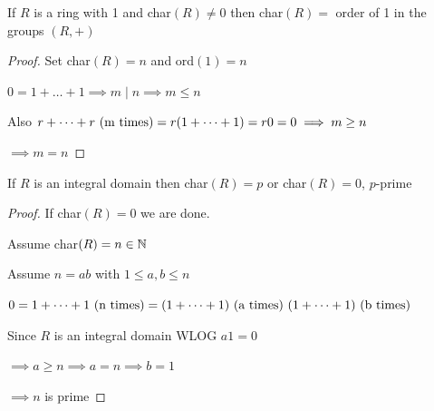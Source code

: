 \begin{proposition}
    If $R$ is a ring with 1  and char$(R)\neq 0$ then char$(R)=$ order of 1 in the groups
    $(R,+)$
\end{proposition}

\begin{proof}
    Set char$(R)=n$ and ord$(1)=n$

    $0=1+\dots+1 \implies m \mid n \implies m \leq n$

    Also $r+\dots+r\text{ (m times)}=r(1+\dots+1)=r0=0 \implies m \geq n$

    $\implies m=n$
\end{proof}

\begin{proposition}
    If $R$ is an integral domain then char$(R)=p$ or char$(R)=0$, $p$-prime
\end{proposition}

\begin{proof}
    If char$(R)=0$ we are done.

    Assume char$(R)=n \in \mathbb{N}$

    Assume $n=ab$ with $1\leq a,b\leq n$

    $0=1+\dots+1 \text{ (n times)}=(1+\dots+1) \text{ (a times) }(1+\dots+1)\text{ (b times)}$

    Since $R$ is an integral domain WLOG $a1=0$ 

    $\implies a \geq n \implies a=n \implies b=1$

    $\implies n$ is prime
\end{proof}


